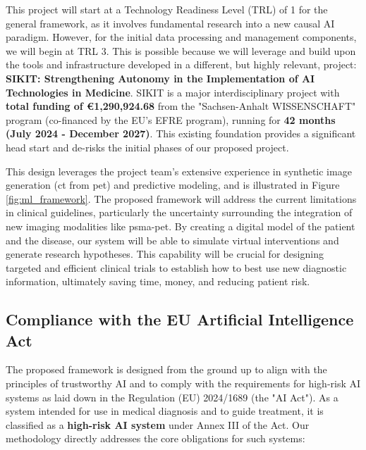 \documentclass[11pt, a4paper]{article}
\begin{document}
This project will start at a Technology Readiness Level (TRL) of 1 for the general framework, as it involves fundamental research into a new causal AI paradigm. However, for the initial data processing and management components, we will begin at TRL 3. This is possible because we will leverage and build upon the tools and infrastructure developed in a different, but highly relevant, project: \textbf{SIKIT: Strengthening Autonomy in the Implementation of AI Technologies in Medicine}. SIKIT is a major interdisciplinary project with \textbf{total funding of €1,290,924.68} from the "Sachsen-Anhalt WISSENSCHAFT" program (co-financed by the EU's EFRE program), running for \textbf{42 months (July 2024 - December 2027)}. This existing foundation provides a significant head start and de-risks the initial phases of our proposed project.

This design leverages the project team's extensive experience in synthetic image generation (\gls{ct} from \gls{pet}) and predictive modeling, and is illustrated in Figure \ref{fig:ml_framework}. The proposed framework will address the current limitations in clinical guidelines, particularly the uncertainty surrounding the integration of new imaging modalities like \gls{psma}-\gls{pet}. By creating a digital model of the patient and the disease, our system will be able to simulate virtual interventions and generate research hypotheses. This capability will be crucial for designing targeted and efficient clinical trials to establish how to best use new diagnostic information, ultimately saving time, money, and reducing patient risk.

\subsection{Compliance with the EU Artificial Intelligence Act}
The proposed framework is designed from the ground up to align with the principles of trustworthy AI and to comply with the requirements for high-risk AI systems as laid down in the Regulation (EU) 2024/1689 (the "AI Act"). As a system intended for use in medical diagnosis and to guide treatment, it is classified as a \textbf{high-risk AI system} under Annex III of the Act. Our methodology directly addresses the core obligations for such systems:
\end{document}
